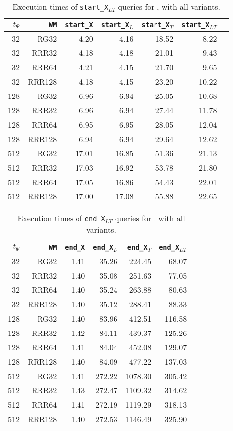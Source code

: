 \begin{table}[hpt!]
\caption{Execution times of \texttt{start\_X$_{LT}$} queries for \ttctr, with all variants.}
\begin{tabular}{|r|r|r|r|r|r|r|}
\hline
$t_{\Psi}$ & \texttt{WM} & \texttt{start\_X} & \texttt{start\_X$_{L}$} & \texttt{start\_X$_{T}$} & \texttt{start\_X$_{LT}$} \\
\hline
32 & RG32 & 4.20 & 4.16 & 18.52 & 8.22 \\
32 & RRR32 & 4.18 & 4.18 & 21.01 & 9.43 \\
32 & RRR64 & 4.21 & 4.15 & 21.70 & 9.65 \\
32 & RRR128 & 4.18 & 4.15 & 23.20 & 10.22 \\
128 & RG32 & 6.96 & 6.94 & 25.05 & 10.68 \\
128 & RRR32 & 6.96 & 6.94 & 27.44 & 11.78 \\
128 & RRR64 & 6.95 & 6.95 & 28.05 & 12.04 \\
128 & RRR128 & 6.94 & 6.94 & 29.64 & 12.62 \\
512 & RG32 & 17.01 & 16.85 & 51.36 & 21.13 \\
512 & RRR32 & 17.03 & 16.92 & 53.78 & 21.80 \\
512 & RRR64 & 17.05 & 16.86 & 54.43 & 22.01 \\
512 & RRR128 & 17.00 & 17.08 & 55.88 & 22.65 \\
\hline
\end{tabular}
\end{table}

\begin{table}[hpt!]
\caption{Execution times of \texttt{end\_X$_{LT}$} queries for \ttctr, with all variants.}
\begin{tabular}{|r|r|r|r|r|r|r|}
\hline
$t_{\Psi}$ & \texttt{WM} & \texttt{end\_X} & \texttt{end\_X$_{L}$} & \texttt{end\_X$_{T}$} & \texttt{end\_X$_{LT}$} \\
\hline
32 & RG32 & 1.41 & 35.26 & 224.45 & 68.07 \\
32 & RRR32 & 1.40 & 35.08 & 251.63 & 77.05 \\
32 & RRR64 & 1.40 & 35.24 & 263.88 & 80.63 \\
32 & RRR128 & 1.40 & 35.12 & 288.41 & 88.33 \\
128 & RG32 & 1.40 & 83.96 & 412.51 & 116.58 \\
128 & RRR32 & 1.42 & 84.11 & 439.37 & 125.26 \\
128 & RRR64 & 1.41 & 84.04 & 452.08 & 129.07 \\
128 & RRR128 & 1.40 & 84.09 & 477.22 & 137.03 \\
512 & RG32 & 1.41 & 272.22 & 1078.30 & 305.42 \\
512 & RRR32 & 1.43 & 272.47 & 1109.32 & 314.62 \\
512 & RRR64 & 1.41 & 272.19 & 1119.29 & 318.13 \\
512 & RRR128 & 1.40 & 272.53 & 1146.49 & 325.90 \\
\hline
\end{tabular}
\end{table}

